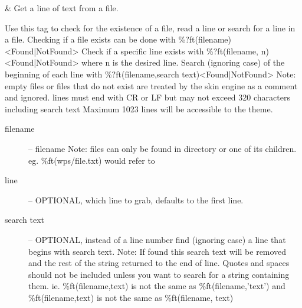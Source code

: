 \begin{tagmap}
   & Get a line of text from a file.\\
\end{tagmap}
    Use this tag to check for the existence of a file, read a line or search for a line in a file.
    Checking if a file exists can be done with \%?ft(filename)<Found|NotFound>\newline
    Check if a specific line exists with \%?ft(filename, n)<Found|NotFound> where n is the desired line.\newline
    Search (ignoring case) of the beginning of each line with \%?ft(filename,search text)<Found|NotFound>\newline
    Note: empty files or files that do not exist are treated by the skin engine as a comment and ignored.\newline
          lines must end  with CR or LF but may not exceed 320 characters including search text \newline
          Maximum 1023 lines will be accessible to the theme.
\begin{description}
    \item[filename] -- filename Note: files can only be found in  directory or one of its children.
            eg. \%ft(wps/file.txt) would refer to 
    \item[line] -- OPTIONAL, which line to grab, defaults to the first line.
    \item[search text] -- OPTIONAL, instead of a line number find (ignoring case) a line that begins with search text.
                    Note: If found this search text will be removed and the rest of the string returned to the end of line.\newline
                    Quotes and spaces should not be included unless you want to search for a string containing them.\newline
                    ie. \%ft(filename,text) is not the same as \%ft(filename,'text') and \%ft(filename,text) is not the same as \%ft(filename, text)
\end{description}

